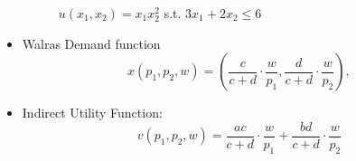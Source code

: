 \documentclass[
12pt, %
a4paper, %
onecolumn, %
portrait %
]{article}
\begin{document}
\begin{itemize}
	\begin{figure}[H]
		\centering
		\caption{$u(x_1,x_2)=x_1x_2^2$ s.t. $3x_1+2x_2\le 6$}
		\label{Fig.lable}
	\end{figure}
	
	\item Walras Demand function
	\[
	x(p_1,p_2,w)=\left(\frac{c}{c+d}\cdot\frac{w}{p_1},\frac{d}{c+d}\cdot\frac{w}{p_2}\right),
	\]
	\item Indirect Utility Function:
	\[
	v(p_1,p_2,w)=\frac{ac}{c+d}\cdot\frac{w}{p_1}+\frac{bd}{c+d}\cdot\frac{w}{p_2}
	\]

\end{itemize}
\end{document}
